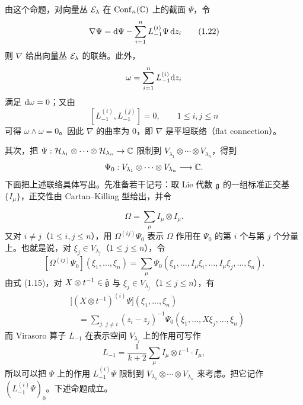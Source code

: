 由这个命题，对向量丛 $\mathcal{E}_\lambda$ 在 $\operatorname{Conf}_n(\mathbb{C})$ 上的截面 $\Psi$，令
\begin{equation}
\nabla\Psi=\mathrm{d}\Psi-\sum_{i=1}^{n}L_{-1}^{(i)}\Psi\,\mathrm{d} z_i \tag{1.22}
\end{equation}
则 $\nabla$ 给出向量丛 $\mathcal{E}_\lambda$ 的联络。此外，
\[
\omega=\sum_{i=1}^{n}L_{-1}^{(i)}\mathrm{d} z_i
\]
满足 $\mathrm{d}\omega=0$；又由
\[
[L_{-1}^{(i)},L_{-1}^{(j)}]=0,\qquad 1\le i,j\le n
\]
可得 $\omega\wedge\omega=0$。因此 $\nabla$ 的曲率为 $0$，即 $\nabla$ 是平坦联络（flat connection）。


其次，把 $\Psi:\mathcal{H}_{\lambda_1}\otimes\cdots\otimes\mathcal{H}_{\lambda_n}\to\mathbb{C}$ 限制到 $V_{\lambda_1}\otimes\cdots\otimes V_{\lambda_n}$，得到
\[
\Psi_0:V_{\lambda_1}\otimes\cdots\otimes V_{\lambda_n}\longrightarrow\mathbb{C} .
\]
下面把上述联络具体写出。先准备若干记号：取 Lie 代数 $\mathfrak{g}$ 的一组标准正交基 $\{I_\mu\}$，正交性由 Cartan--Killing 型给出，并令


\[
\Omega=\sum_{\mu}I_\mu\otimes I_\mu .
\]
又对 $i\ne j$（$1\le i,j\le n$），用 $\Omega^{(ij)}\Psi_0$ 表示 $\Omega$ 作用在 $\Psi_0$ 的第 $i$ 个与第 $j$ 个分量上。也就是说，对 $\xi_j\in V_{\lambda_j}$（$1\le j\le n$），令
\[
[\Omega^{(ij)}\Psi_0](\xi_1,\dots,\xi_n)
=\sum_{\mu}\Psi_0(\xi_1,\dots,I_\mu\xi_i,\dots,I_\mu\xi_j,\dots,\xi_n).
\]
由式 (1.15)，对 $X\otimes t^{-1}\in\hat{\mathfrak{g}}$ 与 $\xi_j\in V_{\lambda_j}$（$1\le j\le n$），有
\begin{equation}
\begin{aligned}
&\bigl[(X\otimes t^{-1})^{(i)}\Psi\bigr](\xi_1,\dots,\xi_n)\\
&\quad=\sum_{j,\,j\ne i}(z_i-z_j)^{-1}\Psi_0(\xi_1,\dots,X\xi_j,\dots,\xi_n)
\end{aligned}
\tag{1.23}
\end{equation}
而 Virasoro 算子 $L_{-1}$ 在表示空间 $V_{\lambda_j}$ 上的作用可写作
\[
L_{-1}=\frac{1}{k+2}\sum_{\mu}I_\mu\otimes t^{-1}\cdot I_\mu ,
\]
所以可以把 $\Psi$ 上的作用 $L_{-1}^{(i)}\Psi$ 限制到 $V_{\lambda_1}\otimes\cdots\otimes V_{\lambda_n}$ 来考虑。把它记作 $(L_{-1}^{(i)}\Psi)_0$。下述命题成立。

